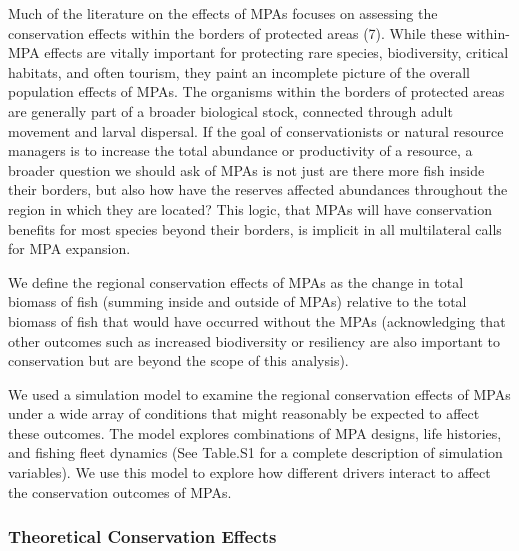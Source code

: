 \documentclass[9pt,twocolumn,twoside,lineno]{pnas-new}
\begin{document}
Much of the literature on the effects of MPAs focuses on assessing the
conservation effects within the borders of protected areas (7). While
these within-MPA effects are vitally important for protecting rare
species, biodiversity, critical habitats, and often tourism, they paint
an incomplete picture of the overall population effects of MPAs. The
organisms within the borders of protected areas are generally part of a
broader biological stock, connected through adult movement and larval
dispersal. If the goal of conservationists or natural resource managers
is to increase the total abundance or productivity of a resource, a
broader question we should ask of MPAs is not just are there more fish
inside their borders, but also how have the reserves affected abundances
throughout the region in which they are located? This logic, that MPAs
will have conservation benefits for most species beyond their borders,
is implicit in all multilateral calls for MPA expansion.

We define the regional conservation effects of MPAs as the change in
total biomass of fish (summing inside and outside of MPAs) relative to
the total biomass of fish that would have occurred without the MPAs
(acknowledging that other outcomes such as increased biodiversity or
resiliency are also important to conservation but are beyond the scope
of this analysis).

We used a simulation model to examine the regional conservation effects
of MPAs under a wide array of conditions that might reasonably be
expected to affect these outcomes. The model explores combinations of
MPA designs, life histories, and fishing fleet dynamics (See Table.S1
for a complete description of simulation variables). We use this model
to explore how different drivers interact to affect the conservation
outcomes of MPAs.

\hypertarget{conservation}{%
\subsubsection*{Theoretical Conservation Effects}\label{conservation}}
\end{document}
